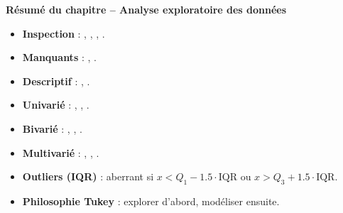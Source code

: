 \begin{formules}
\textbf{R\'esum\'e du chapitre -- Analyse exploratoire des donn\'ees}
\begin{itemize}
    \item \textbf{Inspection} : , , , .
    \item \textbf{Manquants} : , .
    \item \textbf{Descriptif} : , .
    \item \textbf{Univari\'e} : , , .
    \item \textbf{Bivari\'e} : , , .
    \item \textbf{Multivari\'e} : , , .
    \item \textbf{Outliers (IQR)} : aberrant si $x < Q_1 - 1.5 \cdot \text{IQR}$ ou $x > Q_3 + 1.5 \cdot \text{IQR}$.
    \item \textbf{Philosophie Tukey} : explorer d'abord, mod\'eliser ensuite.
\end{itemize}
\end{formules}
